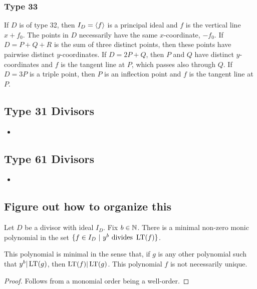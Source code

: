 \subsubsection{Type 33}
  If $D$ is of type 32, then $I_D = \left\langle f \right\rangle$ is a principal ideal and $f$ is the vertical line $x + f_0$.
  The points in $D$ necessarily have the same $x$-coordinate, $-f_0$.
  If $D = P + Q + R$ is the sum of three distinct points, then these points have pairwise distinct $y$-coordinates.
  If $D = 2P + Q$, then $P$ and $Q$ have distinct $y$-coordinates and $f$ is the tangent line at $P$, which passes also through $Q$.
  If $D = 3P$ is a triple point, then $P$ is an inflection point and $f$ is the tangent line at $P$.



\subsection{Type 31 Divisors}

\begin{itemize}
  \item
\end{itemize}



\subsection{Type 61 Divisors}

\begin{itemize}
  \item
\end{itemize}



\subsection{Figure out how to organize this}

\begin{lemma}
  Let $D$ be a divisor with ideal $I_D$.
  Fix $b \in \mathbb{N}$.
  There is a minimal non-zero monic polynomial in the set $\{ f \in I_D ~|~ y^b \text{ divides } \operatorname{LT}(f)\}$.
\end{lemma}
This polynomial is minimal in the sense that, if $g$ is any other polynomial such that $y^b|\operatorname{LT}(g)$,
then $\operatorname{LT}(f)|\operatorname{LT}(g)$.
This polynomial $f$ is not necessarily unique.
\begin{proof}
  Follows from a monomial order being a well-order.
\end{proof}

